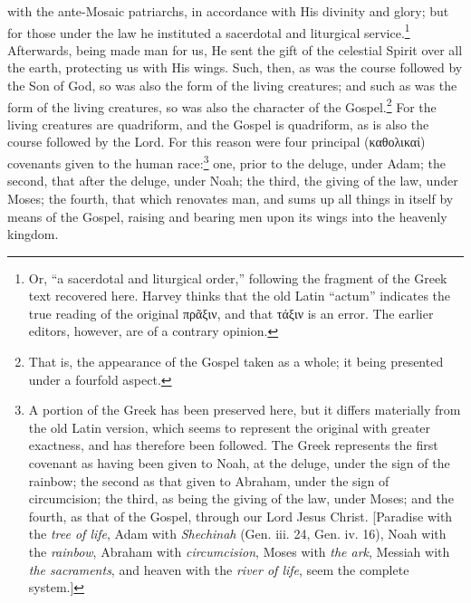 with the ante-Mosaic patriarchs, in accordance with His divinity  and glory; but for those under the law he instituted a sacerdotal and liturgical service.\footnote{Or, “a sacerdotal and liturgical order,” following the fragment of the Greek text recovered here. Harvey thinks that the old Latin “actum” indicates the true reading of the original \textgreek{πρᾶξιν}, and that \textgreek{τάξιν} is an error. The earlier editors, however, are of a contrary opinion.} Afterwards, being made man for us, He sent the gift of the celestial Spirit over all the earth, protecting us with His wings. Such, then, as was the course followed by the Son of God, so was also the form of the living creatures; and such as was the form of the living creatures, so was also the character of the Gospel.\footnote{That is, the appearance of the Gospel taken as a whole; it being presented under a fourfold aspect.} For the living creatures are quadriform, and the Gospel is quadriform, as is also the course followed by the Lord. For this reason were four principal (\textgreek{καθολικαί}) covenants given to the human race:\footnote{A portion of the Greek has been preserved here, but it differs materially from the old Latin version, which seems to represent the original with greater exactness, and has therefore been followed. The Greek represents the first covenant as having been given to Noah, at the deluge, under the sign of the rainbow; the second as that given to Abraham, under the sign of circumcision; the third, as being the giving of the law, under Moses; and the fourth, as that of the Gospel, through our Lord Jesus Christ. [Paradise with the \emph{tree of life}, Adam with \emph{Shechinah} (Gen. iii. 24, Gen. iv. 16), Noah with the \emph{rainbow}, Abraham with \emph{circumcision}, Moses with \emph{the ark}, Messiah with \emph{the sacraments}, and heaven with the \emph{river of life}, seem the complete system.]} one, prior to the deluge, under Adam; the second, that after the deluge, under Noah; the third, the giving of the law, under Moses; the fourth, that which renovates man, and sums up all things in itself by means of the Gospel, raising and bearing men upon its wings into the heavenly kingdom.

